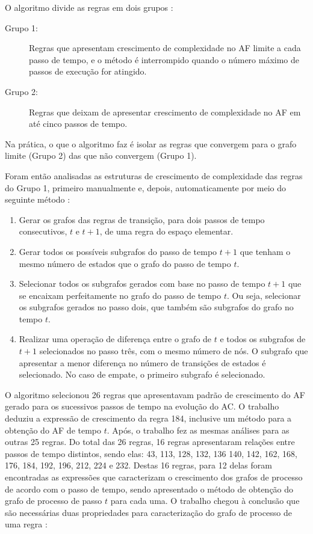 \documentclass[12pt,a4paper]{article}
\begin{document}
O algoritmo divide as regras em dois grupos :

\begin{description}
\item[Grupo 1:] Regras que apresentam crescimento de complexidade no AF
limite a cada passo de tempo, e o método é interrompido quando o
número máximo de passos de execução for atingido.
\item[Grupo 2:] Regras que deixam de apresentar crescimento de complexidade no
AF em até cinco passos de tempo.
\end{description}

Na prática, o que o algoritmo faz é isolar as regras que convergem para o
grafo limite (Grupo 2) das que não convergem (Grupo 1). 

Foram então analisadas as estruturas de crescimento de complexidade das regras
do Grupo 1, primeiro manualmente e, depois, automaticamente por meio do
seguinte método :

\begin{enumerate}\label{sec:mikialgo}
\item Gerar os grafos das regras de transição, para dois passos de tempo
consecutivos, $t$ e $t+1$, de uma regra do espaço elementar.

\item Gerar todos os possíveis subgrafos do passo de tempo $t+1$ que tenham
o mesmo número de estados que o grafo do passo de tempo $t$.

\item Selecionar todos os subgrafos gerados com base no passo de tempo $t+1$
que se encaixam perfeitamente no grafo do passo de tempo $t$. Ou seja,
selecionar os subgrafos gerados no passo dois, que também são subgrafos do
grafo no tempo $t$.

\item Realizar uma operação de diferença entre o grafo de $t$ e todos os
subgrafos de $t+1$ selecionados no passo três, com o mesmo número de nós. O
subgrafo que apresentar a menor diferença no número de transições de estados
é selecionado. No caso de empate, o primeiro subgrafo é selecionado.
\end{enumerate}

O algoritmo selecionou 26 regras que apresentavam padrão
de crescimento do AF gerado para os sucessivos passos de tempo na evolução
do AC. O trabalho deduziu a expressão de crescimento da regra 184, inclusive
um método para a obtenção do AF de tempo $t$. Após, o trabalho fez as mesmas
análises para as outras 25 regras. Do total das 26 regras, 16 regras
apresentaram relações entre passos de tempo distintos, sendo elas: 43, 113,
128, 132, 136 140, 142, 162, 168, 176, 184, 192, 196, 212, 224 e 232. Destas
16 regras, para 12 delas foram encontradas as expressões que caracterizam o
crescimento dos grafos de processo de acordo com o passo de tempo, sendo
apresentado o método de obtenção do grafo de processo de passo $t$ para cada uma.
O trabalho chegou à conclusão que são necessárias duas
propriedades para caracterização do grafo de processo de uma regra
:
\end{document}
